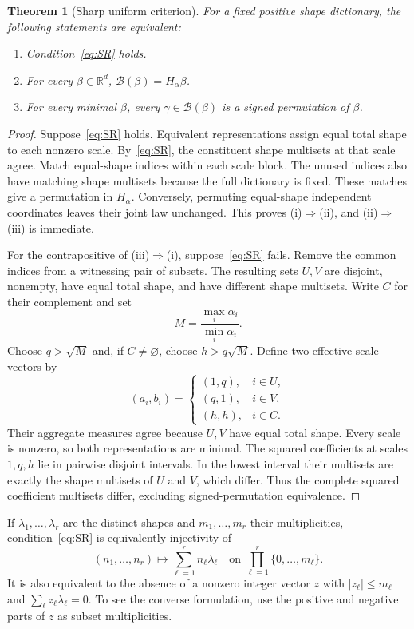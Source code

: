 \documentclass[11pt]{article}
\newtheorem{theorem}{Theorem}[section]
\theoremstyle{definition}\newtheorem{definition}[theorem]{Definition}
\theoremstyle{remark}\newtheorem{remark}[theorem]{Remark}
\newcommand{\R}{\mathbb R}
\newcommand{\B}{\mathcal B}
\begin{document}
\begin{theorem}[Sharp uniform criterion]\label{thm:sharp}
For a fixed positive shape dictionary, the following statements are equivalent:
\begin{enumerate}[label=(\roman*),nosep]
\item Condition~\eqref{eq:SR} holds.
\item For every $\beta\in\R^d$, $\B(\beta)=H_\alpha\beta$.
\item For every minimal $\beta$, every $\gamma\in\B(\beta)$ is a signed permutation of $\beta$.
\end{enumerate}
\end{theorem}
\begin{proof}
Suppose~\eqref{eq:SR} holds. Equivalent representations assign equal total shape to each nonzero scale. By~\eqref{eq:SR}, the constituent shape multisets at that scale agree. Match equal-shape indices within each scale block. The unused indices also have matching shape multisets because the full dictionary is fixed. These matches give a permutation in $H_\alpha$. Conversely, permuting equal-shape independent coordinates leaves their joint law unchanged. This proves (i)$\Rightarrow$(ii), and (ii)$\Rightarrow$(iii) is immediate.

For the contrapositive of (iii)$\Rightarrow$(i), suppose~\eqref{eq:SR} fails. Remove the common indices from a witnessing pair of subsets. The resulting sets $U,V$ are disjoint, nonempty, have equal total shape, and have different shape multisets. Write $C$ for their complement and set
\[
 M=\frac{\max_i\alpha_i}{\min_i\alpha_i}.
\]
Choose $q>\sqrt M$ and, if $C\ne\varnothing$, choose $h>q\sqrt M$. Define two effective-scale vectors by
\[
 (a_i,b_i)=\begin{cases}
 (1,q),&i\in U,\\
 (q,1),&i\in V,\\
 (h,h),&i\in C.
 \end{cases}
\]
Their aggregate measures agree because $U,V$ have equal total shape. Every scale is nonzero, so both representations are minimal. The squared coefficients at scales $1,q,h$ lie in pairwise disjoint intervals. In the lowest interval their multisets are exactly the shape multisets of $U$ and $V$, which differ. Thus the complete squared coefficient multisets differ, excluding signed-permutation equivalence.
\end{proof}

If $\lambda_1,\ldots,\lambda_r$ are the distinct shapes and $m_1,\ldots,m_r$ their multiplicities, condition~\eqref{eq:SR} is equivalently injectivity of
\begin{equation}\label{eq:counts}
 (n_1,\ldots,n_r)\longmapsto\sum_{\ell=1}^r n_\ell\lambda_\ell
 \quad\text{on }\prod_{\ell=1}^r\{0,\ldots,m_\ell\}.
\end{equation}
It is also equivalent to the absence of a nonzero integer vector $z$ with $|z_\ell|\le m_\ell$ and $\sum_\ell z_\ell\lambda_\ell=0$. To see the converse formulation, use the positive and negative parts of $z$ as subset multiplicities.
\end{document}

